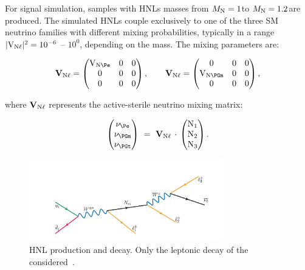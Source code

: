For signal simulation, samples with HNLs masses from 
$M_{\mathrm{N}} = 1$\GeV to $M_{\mathrm{N}} = 1.2$\TeV are produced. The simulated HNLs couple
exclusively to one of the three SM neutrino families with different
mixing probabilities, typically in a range $\mathrm{|V_{\mathrm{N}\ell}|^2} = 10^{-6}$ -- $10^{0}$,
depending on the mass. The mixing parameters are:
\begin{linenomath}
\begin{equation}
  \mathbf{V}_{\hnl\ell} =
  \begin{pmatrix}
    \mathrm{V}_{\hnl\Pe} & 0 & 0 \\
    0                   & 0 & 0 \\
    0                   & 0 & 0 \\
  \end{pmatrix},
\quad\quad
  \mathbf{V}_{\hnl\ell} =
  \begin{pmatrix}
    0                    & 0 & 0 \\
    \mathrm{V}_{\hnl\PGm} & 0 & 0 \\
    0                    & 0 & 0 \\
  \end{pmatrix},
\end{equation}
\end{linenomath}
where $\mathbf{V}_{\mathrm{N}\ell}$ represents the active-sterile neutrino
mixing matrix:
\begin{linenomath}
\begin{equation}
  \begin{pmatrix}
    \nu_{\Pe}  \\
    \nu_{\PGm} \\
    \nu_{\PGt} \\
  \end{pmatrix} ~=~
  \mathbf{V}_{\hnl\ell}\,\cdot\,
  \begin{pmatrix}
    \hnl_{1} \\
    \hnl_{2} \\
    \hnl_{3} \\
  \end{pmatrix}.
\end{equation}
\end{linenomath}

\begin{figure}[h!]
\centering
 \includegraphics[clip,trim=0.5cm 0.5cm 0.5cm 2.5cm, width=0.75\textwidth]{Figures/c4/hnl_graph}
  \caption{HNL production and decay. Only the leptonic decay of the \PW considered~\cite{Pascoli_2019}.}
  \label{fig:c46}
\end{figure}


